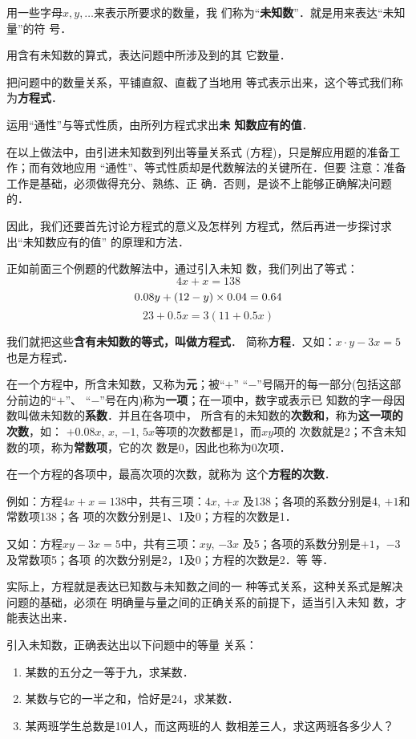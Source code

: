     用一些字母$x,  y,\ldots$来表示所要求的数量，我
们称为“\textbf{未知数}”．就是用来表达“未知量”的符
号．

    用含有未知数的算式，表达问题中所涉及到的其
它数量．

    把问题中的数量关系，平铺直叙、直截了当地用
等式表示出来，这个等式我们称为\textbf{方程式}．

    运用“通性”与等式性质，由所列方程式求出\textbf{未
知数应有的值}．

    在以上做法中，由引进未知数到列出等量关系式
  (方程)，只是解应用题的准备工作；而有效地应用
  “通性”、等式性质却是代数解法的关键所在．但要
注意：准备工作是基础，必须做得充分、熟练、正
确．否则，是谈不上能够正确解决问题的．

    因此，我们还要首先讨论方程式的意义及怎样列
方程式，然后再进一步探讨求出“未知数应有的值”
的原理和方法．

    正如前面三个例题的代数解法中，通过引入未知
数，我们列出了等式：
\[4x+x=138\]
\[0.08y+(12-y)\times 0.04=0.64\]
\[23+0.5x=3(11+0.5x)\]

我们就把这些\textbf{含有未知数的等式，叫做方程式}．
简称\textbf{方程}．又如：$x\cdot y-3x=5$也是方程式．

在一个方程中，所含未知数，又称为\textbf{元}；被“$+$”
“$-$”号隔开的每一部分(包括这部分前边的“$+$”、
“$-$”号在内)称为\textbf{一项}；在一项中，数字或表示已
知数的字一母因数叫做未知数的\textbf{系数}．并且在各项中，
所含有的未知数的\textbf{次数和}，称为\textbf{这一项的次数}，如：
$+ 0. 08x$,  $x$, $-1$, $5x$等项的次数都是1，而$xy$项的
次数就是2；不含未知数的项，称为\textbf{常数项}，它的次
数是0，因此也称为0次项．

  在一个方程的各项中，最高次项的次数，就称为
这个\textbf{方程的次数}．

  例如：方程$4x+x=138$中，共有三项：$4 x$, $+x$
及138；各项的系数分别是4, $+1$和常数项138；各
项的次数分别是1、1及0；方程的次数是1．

  又如：方程$xy-3x=5$中，共有三项：$xy$, $-3x$
及5；各项的系数分别是$+1$，$-3$及常数项5；各项
的次数分别是2，1及0；方程的次数是2．等
等．

  实际上，方程就是表达已知数与未知数之间的一
种等式关系，这种关系式是解决问题的基础，必须在
明确量与量之间的正确关系的前提下，适当引入未知
数，才能表达出来．

\begin{example}
引入未知数，正确表达出以下问题中的等量
关系：
\begin{enumerate}
    \item 某数的五分之一等于九，求某数．
    \item 某数与它的一半之和，恰好是24，求某数．
    \item 某两班学生总数是101人，而这两班的人
    数相差三人，求这两班各多少人？
\end{enumerate}
\end{example}

